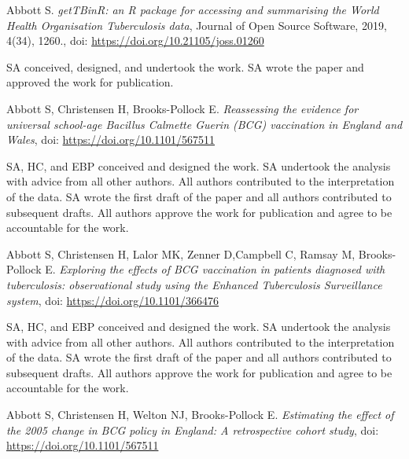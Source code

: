 \documentclass[11pt,twoside]{bristolthesis}
\begin{document}
      \begin{contribution}
      Abbott S. \emph{getTBinR: an R package for accessing and summarising the World Health Organisation Tuberculosis data}, Journal of Open Source Software, 2019, 4(34), 1260., doi: \url{https://doi.org/10.21105/joss.01260}
      
      \par
      
      SA conceived, designed, and undertook the work. SA wrote the paper and approved the work for publication.
      
      \par
      
      Abbott S, Christensen H, Brooks-Pollock E. \emph{Reassessing the evidence for universal school-age Bacillus Calmette Guerin (BCG) vaccination in England and Wales}, doi: \url{https://doi.org/10.1101/567511}
      
      \par
      
      SA, HC, and EBP conceived and designed the work. SA undertook the analysis with advice from all other authors. All authors contributed to the interpretation of the data. SA wrote the first draft of the paper and all authors contributed to subsequent drafts. All authors approve the work for publication and agree to be accountable for the work.
      
      \par
      
      Abbott S, Christensen H, Lalor MK, Zenner D,Campbell C, Ramsay M, Brooks-Pollock E. \emph{Exploring the effects of BCG vaccination in patients diagnosed with tuberculosis: observational study using the Enhanced Tuberculosis Surveillance system}, doi: \url{https://doi.org/10.1101/366476}
      
      \par
      
      SA, HC, and EBP conceived and designed the work. SA undertook the analysis with advice from all other authors. All authors contributed to the interpretation of the data. SA wrote the first draft of the paper and all authors contributed to subsequent drafts. All authors approve the work for publication and agree to be accountable for the work.
      
      \par
      
      Abbott S, Christensen H, Welton NJ, Brooks-Pollock E. \emph{Estimating the effect of the 2005 change in BCG policy in England: A retrospective cohort study}, doi: \url{https://doi.org/10.1101/567511}
      

\end{contribution}
\end{document}
